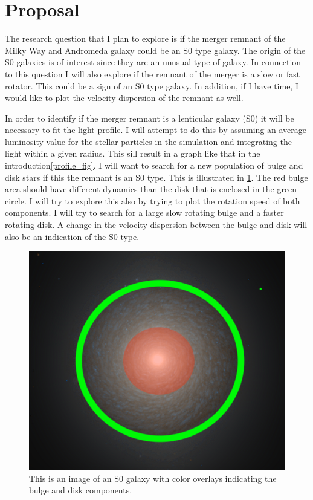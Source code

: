 \documentclass[%
 reprint,
 amsmath,amssymb,
 aps,
]{revtex4-2}
\begin{document}
\section{Proposal}
The research question that I plan to explore is if the merger remnant of the Milky Way and Andromeda galaxy could be an S0 type galaxy. The origin of the S0 galaxies is of interest since they are an unusual type of galaxy. In connection to this question I will also explore if the remnant of the merger is a slow or fast rotator. This could be a sign of an S0 type galaxy. In addition, if I have time, I would like to plot the velocity dispersion of the remnant as well.

In order to identify if the merger remnant is a lenticular galaxy (S0) it will be necessary to fit the light profile. I will attempt to do this by assuming an average luminosity value for the stellar particles in the simulation and integrating the light within a given radius. This sill result in a graph like that in the introduction\ref{profile_fig}\cite{Querejeta_2015}. I will want to search for a new population of bulge and disk stars if this the remnant is an S0 type. This is illustrated in \ref{fig_2}. The red bulge area should have different dynamics than the disk that is enclosed in the green circle. I will try to explore this also by trying to plot the rotation speed of both components. I will try to search for a large slow rotating bulge and a faster rotating disk. A change in the velocity dispersion between the bulge and disk will also be an indication of the S0 type.
\begin{figure}
    \centering
    \includegraphics[scale=0.35]{NGC1387_-_hst_10217R850GB475.png}
    \caption{This is an image of an S0 galaxy with color overlays indicating the bulge and disk components.}
    \label{fig_2}
\end{figure}
\end{document}
